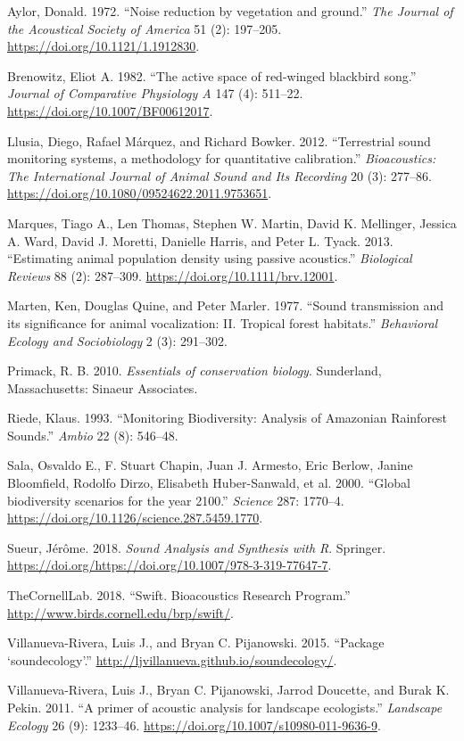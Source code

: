 \documentclass[fleqn,10pt,lineno]{wlpeerj} %
\begin{document}
\leavevmode\hypertarget{ref-Aylor1972}{}%
Aylor, Donald. 1972. ``Noise reduction by vegetation and ground.''
\emph{The Journal of the Acoustical Society of America} 51 (2):
197--205. \url{https://doi.org/10.1121/1.1912830}.

\leavevmode\hypertarget{ref-Brenowitz1982}{}%
Brenowitz, Eliot A. 1982. ``The active space of red-winged blackbird
song.'' \emph{Journal of Comparative Physiology A} 147 (4): 511--22.
\url{https://doi.org/10.1007/BF00612017}.

\leavevmode\hypertarget{ref-Llusia2012}{}%
Llusia, Diego, Rafael Márquez, and Richard Bowker. 2012. ``Terrestrial
sound monitoring systems, a methodology for quantitative calibration.''
\emph{Bioacoustics: The International Journal of Animal Sound and Its
Recording} 20 (3): 277--86.
\url{https://doi.org/10.1080/09524622.2011.9753651}.

\leavevmode\hypertarget{ref-Marques2013}{}%
Marques, Tiago A., Len Thomas, Stephen W. Martin, David K. Mellinger,
Jessica A. Ward, David J. Moretti, Danielle Harris, and Peter L. Tyack.
2013. ``Estimating animal population density using passive acoustics.''
\emph{Biological Reviews} 88 (2): 287--309.
\url{https://doi.org/10.1111/brv.12001}.

\leavevmode\hypertarget{ref-Marten1977}{}%
Marten, Ken, Douglas Quine, and Peter Marler. 1977. ``Sound transmission
and its significance for animal vocalization: II. Tropical forest
habitats.'' \emph{Behavioral Ecology and Sociobiology} 2 (3): 291--302.

\leavevmode\hypertarget{ref-Primack2010}{}%
Primack, R. B. 2010. \emph{Essentials of conservation biology}.
Sunderland, Massachusetts: Sinaeur Associates.

\leavevmode\hypertarget{ref-Riede1993}{}%
Riede, Klaus. 1993. ``Monitoring Biodiversity: Analysis of Amazonian
Rainforest Sounds.'' \emph{Ambio} 22 (8): 546--48.

\leavevmode\hypertarget{ref-Salaetal2000}{}%
Sala, Osvaldo E., F. Stuart Chapin, Juan J. Armesto, Eric Berlow, Janine
Bloomfield, Rodolfo Dirzo, Elisabeth Huber-Sanwald, et al. 2000.
``Global biodiversity scenarios for the year 2100.'' \emph{Science} 287:
1770--4. \url{https://doi.org/10.1126/science.287.5459.1770}.

\leavevmode\hypertarget{ref-Sueur2018}{}%
Sueur, Jérôme. 2018. \emph{Sound Analysis and Synthesis with R}.
Springer.
\url{https://doi.org/https://doi.org/10.1007/978-3-319-77647-7}.

\leavevmode\hypertarget{ref-TheCornellLab2018}{}%
TheCornellLab. 2018. ``Swift. Bioacoustics Research Program.''
\url{http://www.birds.cornell.edu/brp/swift/}.

\leavevmode\hypertarget{ref-Villanueva2015}{}%
Villanueva-Rivera, Luis J., and Bryan C. Pijanowski. 2015. ``Package
`soundecology'.'' \url{http://ljvillanueva.github.io/soundecology/}.

\leavevmode\hypertarget{ref-Villanuevaetal2011}{}%
Villanueva-Rivera, Luis J., Bryan C. Pijanowski, Jarrod Doucette, and
Burak K. Pekin. 2011. ``A primer of acoustic analysis for landscape
ecologists.'' \emph{Landscape Ecology} 26 (9): 1233--46.
\url{https://doi.org/10.1007/s10980-011-9636-9}.
\end{document}
